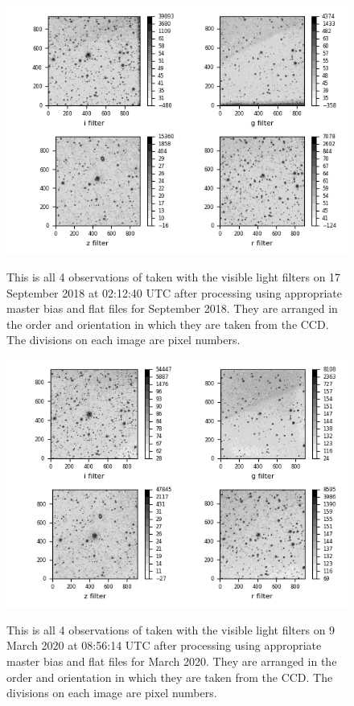 \begin{figure}[!htbp]
\begin{center}
\includegraphics[scale=1]{images/init4example.png}
\end{center}   
\caption{This is all 4 observations of {\prox} taken with the visible light
filters on 17 September 2018 at 02:12:40 UTC after processing using
appropriate master bias and flat files for September 2018. They are arranged in
the order and orientation in which they are taken from the CCD. The
divisions on each image are pixel numbers.}
\protect\label{fig:init4example}
\end{figure}

\begin{figure}[!htbp]
\begin{center}
\includegraphics[scale=1]{images/init4example20.png}
\end{center}   
\caption{This is all 4 observations of {\prox} taken with the visible light
filters on 9 March 2020 at 08:56:14 UTC after processing using
appropriate master bias and flat files for March 2020. They are arranged in
the order and orientation in which they are taken from the CCD. The
divisions on each image are pixel numbers.}
\protect\label{fig:init4example20}
\end{figure}

